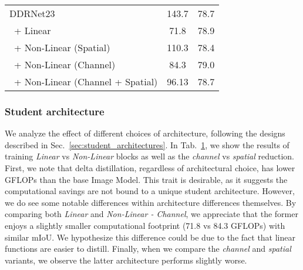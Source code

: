 \documentclass[runningheads]{llncs}
\begin{document}
\begin{table}[b!]
\begin{minipage}[t]{.475\columnwidth}
{\begin{tabular}{lcc}
    \rowcolor{Gray}
    DDRNet23             & 143.7       & 78.7\\
    \quad~+ Linear             & 71.8       & 78.9\\
    \quad~+ Non-Linear (Spatial)             & 110.3       & 78.4 \\
    \quad~+ Non-Linear (Channel)             & 84.3       & 79.0 \\
    \quad~+ Non-Linear (Channel + Spatial)  & 96.13       & 78.7 \\
    \bottomrule
    \end{tabular}}
    \vspace{-4mm}
    \label{tab:ablation_student_architecture} 
\end{minipage}
\end{table} %
\label{sec:exp_ablation}
\subsubsection{Student architecture}
We analyze the effect of different choices of architecture, following the designs described in Sec.~\ref{sec:student_architectures}. 
In Tab.~\ref{tab:ablation_student_architecture}, we show the results of training \textit{Linear} vs \textit{Non-Linear} blocks as well as the \textit{channel} vs \textit{spatial} reduction.
First, we note that delta distillation, regardless of architectural choice, has lower GFLOPs than the base Image Model.
This trait is desirable, as it suggests the computational savings are not bound to a unique student architecture.
However, we do see some notable differences within architecture differences themselves.
By comparing both \textit{Linear} and \textit{Non-Linear - Channel}, we appreciate that the former enjoys a slightly smaller computational footprint (71.8 vs 84.3 GFLOPs) with similar mIoU. We hypothesize this difference could be due to the fact that linear functions are easier to distill.
Finally, when we compare the \textit{channel} and \textit{spatial} variants, we observe the latter architecture performs slightly worse.
\end{document}
